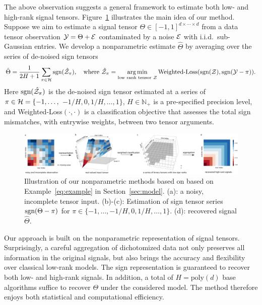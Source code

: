 \documentclass[11pt]{article}
\def\sign{\textup{sgn}}
\theoremstyle{exampstyle}
\theoremstyle{definition}
\def\sign{\textup{sgn}}
\begin{document}
The above observation suggests a general framework to estimate both low- and high-rank signal tensors. Figure~\ref{fig:demo} illustrates the main idea of our method. Suppose we aim to estimate a signal tensor $\Theta\in[-1,1]^{d\times\cdots\times d}$ from a data tensor observation $\mathcal{Y}=\Theta+\mathcal{E}$ contaminated by a noise $\mathcal{E}$ with i.i.d.\ sub-Gaussian entries. We develop a nonparametric estimate $\hat \Theta$ by averaging over the series of de-noised sign tensors
\begin{equation}\label{eq:nonparametric}
\hat \Theta = {1\over 2H+1}\sum_{\pi \in \tH} \sign(\hat \tZ_\pi), \quad \text{where}\ \hat \tZ_\pi=\argmin_{\text{low rank tensor $\tZ$}} \text{Weighted-Loss}(\sign(\tZ), \sign (\tY-\pi)).
\end{equation}
Here $\sign(\hat \tZ_\pi)$ is the de-noised sign tensor estimated at a series of $\pi\in \mathcal{H}=\{\small-1,\ldots,$ $-{1/H},0, {1/H},\ldots,1\}$, $H\in\mathbb{N}_{+}$ is a pre-specified precision level, and Weighted-Loss$(\cdot, \cdot)$ is a classification objective that assesses the total sign mismatches, with entrywise weights, between two tensor arguments. \begin{figure}[http]
\centerline{\includegraphics[width=1\textwidth]{demo_sign.pdf}}
\caption{Illustration of our nonparametric methods based on based on Example~\ref{eq:example} in Section~\ref{sec:model}. (a): a noisy, incomplete tensor input. (b)-(c): Estimation of sign tensor series $\sign(\Theta-\pi)$ for $\pi\in  \{-1,\ldots,-{1/ H},0,{1/H},\ldots,1\}$. (d): recovered signal $\hat \Theta$.
}\label{fig:demo}
\vspace{-.4cm}
\end{figure}

Our approach is built on the nonparametric representation of signal tensors. Surprisingly, a careful aggregation of dichotomized data not only preserves all information in the original signals, but also brings the accuracy and flexibility over classical low-rank models. The sign representation is guaranteed to recover both low- and high-rank signals. In addition, a total of $H=\text{poly}(d)$ base algorithms suffice to recover $\Theta$ under the considered model.  The method therefore enjoys both statistical and computational efficiency. 
\end{document}
